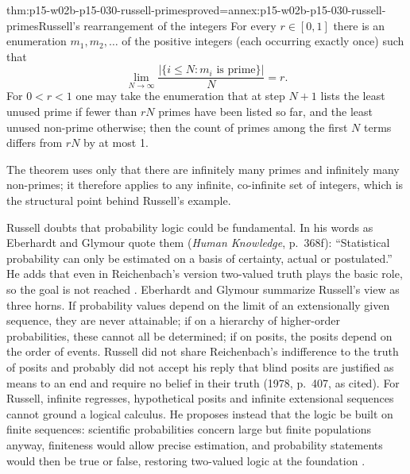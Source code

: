 \begin{hbtheorem}{thm:p15-w02b-p15-030-russell-primes}{proved=annex:p15-w02b-p15-030-russell-primes}{Russell's rearrangement of the integers}
For every \(r\in[0,1]\) there is an enumeration \(m_1,m_2,\ldots\) of the
positive integers (each occurring exactly once) such that
\[
 \lim_{N\to\infty}\frac{|\{i\leq N: m_i\text{ is prime}\}|}{N}=r.
\]
For \(0<r<1\) one may take the enumeration that at step \(N+1\) lists the
least unused prime if fewer than \(rN\) primes have been listed so far,
and the least unused non-prime otherwise; then the count of primes among
the first \(N\) terms differs from \(rN\) by at most 1.
\end{hbtheorem}

The theorem uses only that there are infinitely many primes and
infinitely many non-primes; it therefore applies to any infinite,
co-infinite set of integers, which is the structural point behind
Russell's example.

Russell doubts that probability logic could be fundamental. In his words
as Eberhardt and Glymour quote them (\emph{Human Knowledge}, p.~368f):
\enquote{Statistical probability can only be estimated on a basis of
certainty, actual or postulated.} He adds that even in Reichenbach's
version two-valued truth plays the basic role, so the goal is not
reached \cite[p.~381]{EberhardtGlymour2011ReichenbachReading}.
Eberhardt and Glymour summarize Russell's view as three horns. If probability
values depend on the limit of an extensionally given sequence, they are
never attainable; if on a hierarchy of higher-order probabilities, these
cannot all be determined; if on posits, the posits depend on the order of
events. Russell did not share Reichenbach's indifference to the truth of
posits and probably did not accept his reply that blind posits are
justified as means to an end and require no belief in their truth (1978,
p.~407, as cited). For Russell, infinite regresses, hypothetical posits
and infinite extensional sequences cannot ground a logical calculus. He
proposes instead that the logic be built on finite sequences: scientific
probabilities concern large but finite populations anyway, finiteness
would allow precise estimation, and probability statements would then be
true or false, restoring two-valued logic at the foundation
\cite[pp.~381--382]{EberhardtGlymour2011ReichenbachReading}.

